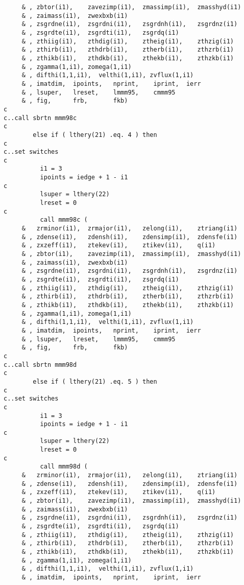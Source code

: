 \begin{verbatim}
     & , zbtor(i1),    zavezimp(i1),  zmassimp(i1),  zmasshyd(i1)
     & , zaimass(i1),  zwexbxb(i1)
     & , zsgrdne(i1),  zsgrdni(i1),   zsgrdnh(i1),   zsgrdnz(i1)
     & , zsgrdte(i1),  zsgrdti(i1),   zsgrdq(i1)
     & , zthiig(i1),   zthdig(i1),    ztheig(i1),    zthzig(i1)
     & , zthirb(i1),   zthdrb(i1),    ztherb(i1),    zthzrb(i1)
     & , zthikb(i1),   zthdkb(i1),    zthekb(i1),    zthzkb(i1)
     & , zgamma(1,i1), zomega(1,i1)
     & , difthi(1,1,i1),  velthi(1,i1), zvflux(1,i1)
     & , imatdim,  ipoints,   nprint,    iprint,  ierr
     & , lsuper,   lreset,    lmmm95,    cmmm95
     & , fig,      frb,       fkb)
c
c..call sbrtn mmm98c
c
        else if ( lthery(21) .eq. 4 ) then
c
c..set switches
c
          i1 = 3
          ipoints = iedge + 1 - i1
c
          lsuper = lthery(22)
          lreset = 0
c
          call mmm98c (
     &   zrminor(i1),  zrmajor(i1),   zelong(i1),    ztriang(i1)
     & , zdense(i1),   zdensh(i1),    zdensimp(i1),  zdensfe(i1)
     & , zxzeff(i1),   ztekev(i1),    ztikev(i1),    q(i1)
     & , zbtor(i1),    zavezimp(i1),  zmassimp(i1),  zmasshyd(i1)
     & , zaimass(i1),  zwexbxb(i1)
     & , zsgrdne(i1),  zsgrdni(i1),   zsgrdnh(i1),   zsgrdnz(i1)
     & , zsgrdte(i1),  zsgrdti(i1),   zsgrdq(i1)
     & , zthiig(i1),   zthdig(i1),    ztheig(i1),    zthzig(i1)
     & , zthirb(i1),   zthdrb(i1),    ztherb(i1),    zthzrb(i1)
     & , zthikb(i1),   zthdkb(i1),    zthekb(i1),    zthzkb(i1)
     & , zgamma(1,i1), zomega(1,i1)
     & , difthi(1,1,i1),  velthi(1,i1), zvflux(1,i1)
     & , imatdim,  ipoints,   nprint,    iprint,  ierr
     & , lsuper,   lreset,    lmmm95,    cmmm95
     & , fig,      frb,       fkb)
c
c..call sbrtn mmm98d
c
        else if ( lthery(21) .eq. 5 ) then
c
c..set switches
c
          i1 = 3
          ipoints = iedge + 1 - i1
c
          lsuper = lthery(22)
          lreset = 0
c
          call mmm98d (
     &   zrminor(i1),  zrmajor(i1),   zelong(i1),    ztriang(i1)
     & , zdense(i1),   zdensh(i1),    zdensimp(i1),  zdensfe(i1)
     & , zxzeff(i1),   ztekev(i1),    ztikev(i1),    q(i1)
     & , zbtor(i1),    zavezimp(i1),  zmassimp(i1),  zmasshyd(i1)
     & , zaimass(i1),  zwexbxb(i1)
     & , zsgrdne(i1),  zsgrdni(i1),   zsgrdnh(i1),   zsgrdnz(i1)
     & , zsgrdte(i1),  zsgrdti(i1),   zsgrdq(i1)
     & , zthiig(i1),   zthdig(i1),    ztheig(i1),    zthzig(i1)
     & , zthirb(i1),   zthdrb(i1),    ztherb(i1),    zthzrb(i1)
     & , zthikb(i1),   zthdkb(i1),    zthekb(i1),    zthzkb(i1)
     & , zgamma(1,i1), zomega(1,i1)
     & , difthi(1,1,i1),  velthi(1,i1), zvflux(1,i1)
     & , imatdim,  ipoints,   nprint,    iprint,  ierr

\end{verbatim}
